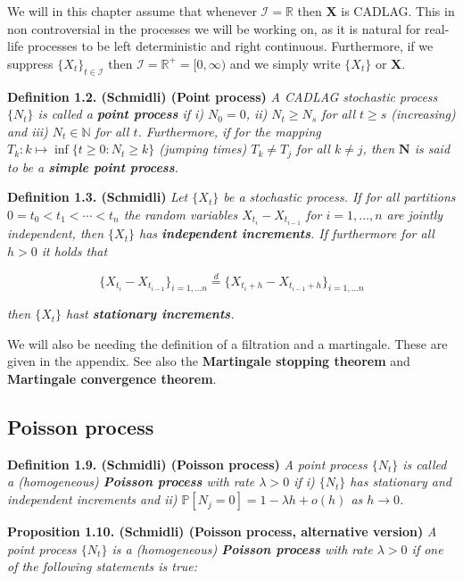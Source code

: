 \documentclass[a4paper,12pt,openany]{book}
\begin{document}
We will in this chapter assume that whenever \(\mathcal I=\mathbb R\) then \(\mathbf X\) is CADLAG. This in non controversial in the processes we will be working on, as it is natural for real-life processes to be left deterministic and right continuous. Furthermore, if we suppress \(\{X_t\}_{t\in \mathcal I}\) then \(\mathcal I=\mathbb R^+=[0,\infty)\) and we simply write \(\{X_t\}\) or \(\mathbf X\).

\textbf{Definition 1.2. (Schmidli) (Point process)} \emph{A CADLAG stochastic process \(\{N_t\}\) is called a \textbf{point process} if i) \(N_0=0\), ii) \(N_t\ge N_s\) for all \(t\ge s\) (increasing) and iii) \(N_t\in \mathbb N\) for all \(t\). Furthermore, if for the mapping \(T_k : k\mapsto\inf\{t\ge 0 : N_t\ge k\}\) (jumping times) \(T_k\ne T_j\) for all \(k\ne j\), then \(\mathbf N\) is said to be a \textbf{simple point process}.}

\textbf{Definition 1.3. (Schmidli)} \emph{Let \(\{X_t\}\) be a stochastic process. If for all partitions \(0=t_0<t_1<\cdots<t_n\) the random variables \(X_{t_i}-X_{t_{i-1}}\) for \(i=1,...,n\) are jointly independent, then \(\{X_t\}\) has \textbf{independent increments}. If furthermore for all \(h>0\) it holds that}

\[
\{X_{t_i}-X_{t_{i-1}}\}_{i=1,...n}\stackrel{d}{=}\{X_{t_i+h}-X_{t_{i-1}+h}\}_{i=1,...n}
\]

\emph{then \(\{X_t\}\) hast \textbf{stationary increments}.}

We will also be needing the definition of a filtration and a martingale. These are given in the appendix. See also the \textbf{Martingale stopping theorem} and \textbf{Martingale convergence theorem}.

\hypertarget{poisson-process}{%
\subsection{Poisson process}\label{poisson-process}}

\textbf{Definition 1.9. (Schmidli) (Poisson process)} \emph{A point process \(\{N_t\}\) is called a (homogeneous) \textbf{Poisson process} with rate \(\lambda >0\) if i) \(\{N_t\}\) has stationary and independent increments and ii) \(\mathbb P[N_j=0]=1-\lambda h+o(h)\) as \(h\to 0\).}

\textbf{Proposition 1.10. (Schmidli) (Poisson process, alternative version)} \emph{A point process \(\{N_t\}\) is a (homogeneous) \textbf{Poisson process} with rate \(\lambda >0\) if one of the following statements is true:}
\end{document}
